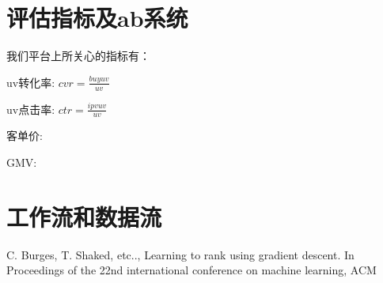 \section{评估指标及ab系统} 
我们平台上所关心的指标有： 
\begin{description} 
	\item uv转化率: $ cvr=\frac{buyuv}{uv} $
	\item uv点击率: $ ctr=\frac{ipvuv}{uv} $
	\item 客单价: 
	\item GMV:
\end{description}

\section{工作流和数据流} 



\begin{thebibliography}{99}
 C. Burges, T. Shaked, etc.., Learning to rank 
using gradient descent. In Proceedings of the 22nd international 
conference on machine learning, ACM
\end{thebibliography}

 
